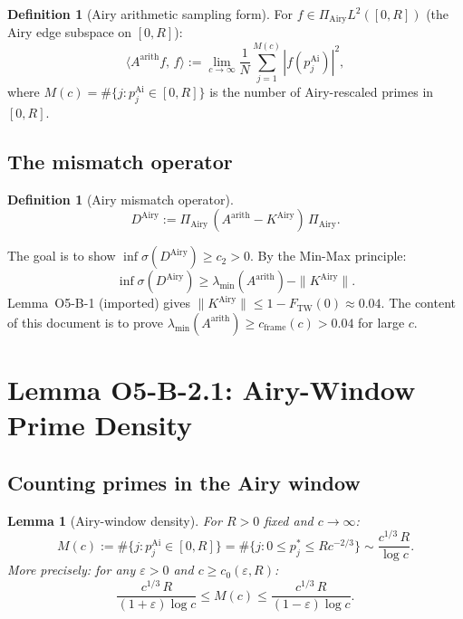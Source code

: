 \documentclass[12pt,a4paper]{amsart}
\newtheorem{lemma}[theorem]{Lemma}
\theoremstyle{definition}
\newtheorem{definition}[theorem]{Definition}
\newcommand{\KAi}{K^{\mathrm{Airy}}}
\newcommand{\DAi}{D^{\mathrm{Airy}}}
\newcommand{\PAi}{\Pi_{\mathrm{Airy}}}
\newcommand{\Aarith}{A^{\mathrm{arith}}}
\newcommand{\norm}[1]{\|#1\|}
\newcommand{\ip}[2]{\langle #1,\, #2\rangle}
\newcommand{\abs}[1]{\left|#1\right|}
\begin{document}
\begin{definition}[Airy arithmetic sampling form]
For $f \in \PAi L^2([0,R])$ (the Airy edge subspace on $[0,R]$):
\begin{equation}\label{eq:Aarith}
  \ip{\Aarith f}{f}
  := \lim_{c\to\infty}\frac{1}{N}\sum_{j=1}^{M(c)}
    \abs{f(p_j^{\mathrm{Ai}})}^2,
\end{equation}
where $M(c) = \#\{j : p_j^{\mathrm{Ai}} \in [0,R]\}$ is the number of
Airy-rescaled primes in $[0,R]$.
\end{definition}

\subsection{The mismatch operator}

\begin{definition}[Airy mismatch operator]
\[
  \DAi := \PAi\,(\Aarith - \KAi)\,\PAi.
\]
\end{definition}

The goal is to show $\inf\sigma(\DAi) \ge c_2 > 0$.
By the Min-Max principle:
\begin{equation}\label{eq:minmax}
  \inf\sigma(\DAi)
  \ge \lambda_{\min}(\Aarith) - \norm{\KAi}.
\end{equation}
Lemma~O5-B-1 (imported) gives $\norm{\KAi} \le 1 - F_{\mathrm{TW}}(0) \approx 0.04$.
The content of this document is to prove
$\lambda_{\min}(\Aarith) \ge c_{\mathrm{frame}}(c) > 0.04$ for large $c$.

\section{Lemma O5-B-2.1: Airy-Window Prime Density}
\label{sec:density}

\subsection{Counting primes in the Airy window}

\begin{lemma}[Airy-window density]\label{lem:density}
For $R > 0$ fixed and $c \to \infty$:
\begin{equation}\label{eq:Mc}
  M(c) := \#\bigl\{j : p_j^{\mathrm{Ai}} \in [0,R]\bigr\}
  = \#\bigl\{j : 0 \le p_j^* \le R c^{-2/3}\bigr\}
  \sim \frac{c^{1/3}\,R}{\log c}.
\end{equation}
More precisely: for any $\varepsilon > 0$ and $c \ge c_0(\varepsilon, R)$:
\[
  \frac{c^{1/3}\,R}{(1+\varepsilon)\log c}
  \le M(c) \le
  \frac{c^{1/3}\,R}{(1-\varepsilon)\log c}.
\]
\end{lemma}
\end{document}

